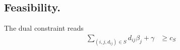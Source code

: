 \subsection{Feasibility.}

The dual constraint reads
\begin{align*}
    \sum_{(i,j,d_{ij}) \in S} d_{ij} \beta_j + \gamma &\geq c_{S} \\
\end{align*}
